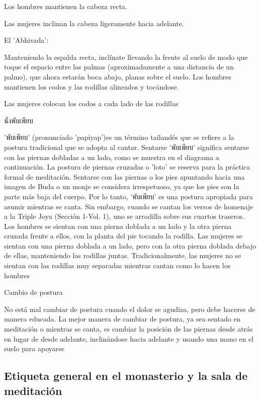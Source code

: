 Los hombres mantienen la cabeza recta.

Las mujeres inclinan la cabeza ligeramente hacia adelante.

El 'Abhivada':

Manteniendo la espalda recta, inclínate llevando la frente al suelo de modo que toque el espacio entre las palmas (aproximadamente a una distancia de un palmo), que ahora estarán boca abajo, planas sobre el suelo. Los hombres mantienen los codos y las rodillas alineados y tocándose.

Las mujeres colocan los codos a cada lado de las rodillas


นั่งพับเพียบ

'พับเพียบ' (pronunciado 'papiyap')es un término tailandés que se refiere a la postura tradicional que se adopta al cantar. Sentarse 'พับเพียบ' significa sentarse con las piernas dobladas a un lado, como se muestra en el diagrama a continuación. La postura de piernas cruzadas o 'loto' se reserva para la práctica formal de meditación. Sentarse con las piernas o los pies apuntando hacia una imagen de Buda o un monje se considera irrespetuoso, ya que los pies son la parte más baja del cuerpo. Por lo tanto, 'พับเพียบ' es una postura apropiada para asumir mientras se canta. Sin embargo, cuando se cantan los versos de homenaje a la Triple Joya (Sección 1-Vol. 1), uno se arrodilla sobre sus cuartos traseros. Los hombres se sientan con una pierna doblada a un lado y la otra pierna cruzada frente a ellos, con la planta del pie tocando la rodilla. Las mujeres se sientan con una pierna doblada a un lado, pero con la otra pierna doblada debajo de ellas, manteniendo las rodillas juntas. Tradicionalmente, las mujeres no se sientan con las rodillas muy separadas mientras cantan como lo hacen los hombres

Cambio de postura

No está mal cambiar de postura cuando el dolor se agudiza, pero debe hacerse de manera educada. La mejor manera de cambiar de postura, ya sea sentado en meditación o mientras se canta, es cambiar la posición de las piernas desde atrás en lugar de desde adelante, inclinándose hacia adelante y usando una mano en el suelo para apoyarse

\subsection{Etiqueta general en el monasterio y la sala de meditación}

